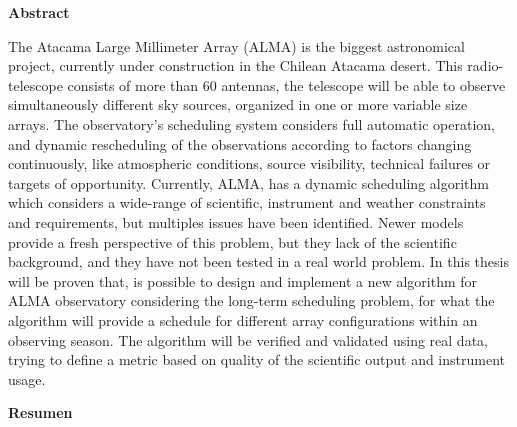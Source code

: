 \thispagestyle{empty}
\vspace*{\fill}

\begin{center}
\begin{LARGE}\textbf{Abstract}\end{LARGE}
\end{center}

The Atacama Large Millimeter Array (ALMA) is the biggest astronomical project, currently under
construction in the Chilean Atacama desert. This radio-telescope consists of more than 60
antennas, the telescope will be able to observe simultaneously different sky sources, organized in one or more
variable size arrays. The observatory's scheduling system considers full automatic
operation, and dynamic rescheduling of the observations according to factors changing continuously, like atmospheric
conditions, source visibility, technical failures or targets of opportunity.
Currently, ALMA, has a dynamic scheduling algorithm which considers a wide-range of scientific,
instrument and weather constraints and requirements, but multiples issues have been
identified. Newer models provide a fresh perspective of this problem, but they lack of the
scientific background, and they have not been tested in a real world problem.
In this thesis will be proven that, is possible to design and implement a new algorithm for ALMA observatory 
considering the long-term scheduling problem, for what the algorithm will provide a schedule 
for different array configurations within an observing
season. The algorithm will be verified and validated using real data, trying to define a metric based on quality
of the scientific output and instrument usage.

\vspace{0.5cm}

\begin{center}
\begin{LARGE}\textbf{Resumen}\end{LARGE}
\end{center}

